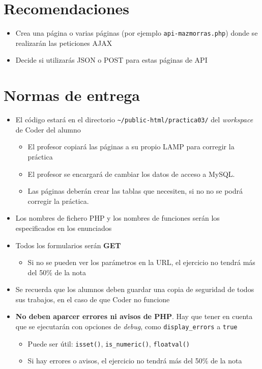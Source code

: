 \documentclass[a4paper]{article}
\begin{document}
\section*{Recomendaciones}
\label{sec:org000000c}
\begin{itemize}
\item Crea una página o varias páginas (por ejemplo \texttt{api-mazmorras.php}) donde se realizarán las peticiones AJAX
\item Decide si utilizarás JSON o POST para estas páginas de API
\end{itemize}


\section*{Normas de entrega}
\label{sec:org000000f}
\begin{itemize}
\item El código estará en el directorio \texttt{\textasciitilde{}/public-html/practica03/} del \emph{workspace} de Coder del alumno
\begin{itemize}
\item El profesor copiará las páginas a su propio LAMP para corregir la práctica
\item El profesor se encargará de cambiar los datos de acceso a MySQL.
\item Las páginas deberán crear las tablas que necesiten, si no no se podrá corregir la práctica.
\end{itemize}
\item Los nombres de fichero PHP y los nombres de funciones serán los especificados en los enunciados
\item Todos los formularios serán \textbf{GET}
\begin{itemize}
\item Si no se pueden ver los parámetros en la URL, el ejercicio no tendrá más del 50\% de la nota
\end{itemize}
\item Se recuerda que los alumnos deben guardar una copia de seguridad de todos sus trabajos, en el caso de que Coder no funcione
\item \textbf{No deben aparcer errores ni avisos de PHP}. Hay que tener en cuenta que se ejecutarán con opciones de \emph{debug}, como \texttt{display\_errors} a \texttt{true}
\begin{itemize}
\item Puede ser útil: \texttt{isset()}, \texttt{is\_numeric()}, \texttt{floatval()}
\item Si hay errores o avisos, el ejercicio no tendrá más del 50\% de la nota

\end{itemize}
\end{itemize}
\end{document}
